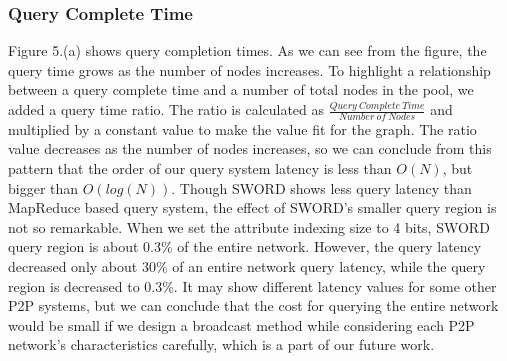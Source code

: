 \documentclass{acm_proc_article-sp}
\begin{document}
\subsubsection{Query Complete Time}
Figure 5.(a) shows query completion times. As we can see from the figure, the query time grows as the number of nodes increases. To highlight a relationship between a query complete time and a number of total nodes in the pool,
we added a query time ratio. The ratio is calculated as \begin{math}\frac{Query\ Complete\ Time}{Number\ of\ Nodes}\end{math} and multiplied by a constant value to make the value fit for the graph.
The ratio value decreases as the number of nodes increases, so we can conclude from this pattern that the order of our query system latency is less than $O(N)$, but bigger than $O(log(N))$.
Though SWORD shows less query latency than MapReduce based query system, the effect of SWORD's smaller query region is not so remarkable. 
When we set the attribute indexing size to 4 bits, SWORD query region is about 0.3\% of the entire network. 
However, the query latency decreased only about 30\% of an entire network query latency, while the query region is decreased to 0.3\%.
It may show different latency values for some other P2P systems, but we can conclude that the cost for querying the entire network would be small if we design a broadcast method while considering
each P2P network's characteristics carefully, which is a part of our future work.
\end{document}
